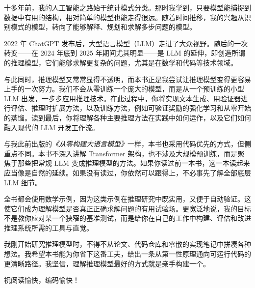 十多年前，我的人工智能之路始于统计模式分类。那时我学到，只要模型能捕捉到数据中有用的结构，相对简单的模型也能走得很远。随着时间推移，我的兴趣从识别模式的模型，转向了能够解释、规划和求解多步问题的模型。

2022 年 ChatGPT 发布后，大型语言模型（LLM）走进了大众视野。随后的一次转变——在 2024 年底到 2025 年期间尤其明显——是 LLM 的延伸，即创造所谓的推理模型，它们能够求解更复杂的问题，尤其是在数学和代码等技术领域。

与此同时，推理模型又常常显得不透明，而本书正是我尝试让推理模型变得更容易上手的一次努力。我们不会从零训练一个庞大的模型，而是从一个预训练的小型 LLM 出发，一步步应用推理技术。在此过程中，你将实现文本生成、用验证器进行评估、推理时扩展方法，以及训练方法，例如可验证奖励的强化学习和从零开始的蒸馏。读到最后，你将理解各种主要推理方法在实践中如何运作，以及它们如何融入现代的 LLM 开发工作流。

与我此前出版的\emph{《从零构建大语言模型》}一样，本书也采用代码优先的方式，但侧重点不同。本书不深入讲解 Transformer 架构，也不涉及大规模预训练，而是聚焦于那些把常规 LLM 变成推理模型的方法。如果你读过前一本书，这一本读起来应当像是自然的延续。如果没有读过，你依然可以跟得上，不必事先了解全部底层 LLM 细节。

全书都会使用数学示例，因为这类示例在推理研究中既实用，又便于自动验证。这使它们成为理解模型是否真正正确求解问题的有用试验场。更宽泛地说，我的目标不是教你应对某一个狭窄的基准测试，而是给你在自己的工作中构建、评估和改进推理系统所需的工具与直觉。

我刚开始研究推理模型时，不得不从论文、代码仓库和零散的实现笔记中拼凑各种想法。我希望本书能为你省下这番工夫，给出一条从第一性原理通向可运行代码的更清晰路径。我坚信，理解推理模型最好的方式就是亲手构建一个。

祝阅读愉快，编码愉快！
